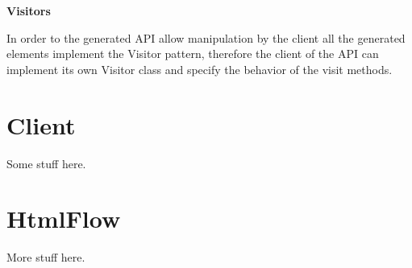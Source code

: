 \textbf{Visitors}

In order to the generated API allow manipulation by the client all the generated elements implement the Visitor pattern, therefore the client of the API can implement its own Visitor class and specify the behavior of the visit methods.

\section{Client} %
\label{sec:client}

Some stuff here.

\section{HtmlFlow}
\label{sec:htmlflow}

More stuff here.
